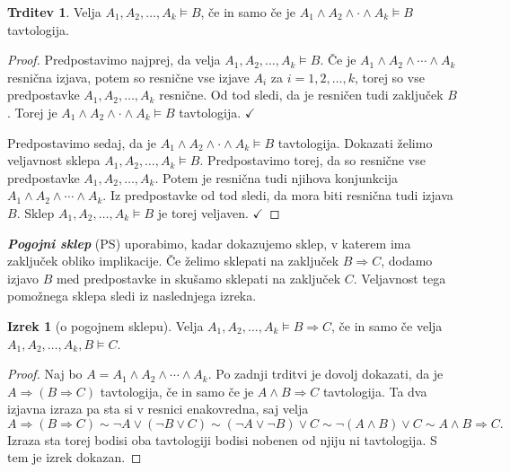 \documentclass[11pt]{book}
\def\definicija{\color{rdeca}\bf\em}
\def\kljuka{$\checkmark$}
\theoremstyle{definition}
\theoremstyle{zgled}
\theoremstyle{odprtproblem}
\theoremstyle{domacanaloga}
\newenvironment{dokaz}
    {\color{siva}\begin{proof}}
    {\end{proof}}
\theoremstyle{izrek}
\newtheorem*{izrek}{Izrek}
\newtheorem*{trditev}{Trditev}
\begin{document}
\begin{trditev}
Velja $A_1, A_2, \dots, A_k \models B$, če in samo če je $A_1 \land A_2 \land \cdot \land A_k \models B$ tavtologija.
\end{trditev}
\begin{dokaz}
Predpostavimo najprej, da velja $A_1, A_2, \dots, A_k \models B$. Če je $A_1 \land A_2 \land \cdots \land A_k$ resnična izjava, potem so resnične vse izjave $A_i$ za $i = 1,2, \dots, k$, torej so vse predpostavke $A_1, A_2, \dots, A_k$ resnične. Od tod sledi, da je resničen tudi zaključek $B$. Torej je $A_1 \land A_2 \land \cdot \land A_k \models B$ tavtologija. \kljuka

Predpostavimo sedaj, da je $A_1 \land A_2 \land \cdot \land A_k \models B$ tavtologija. Dokazati želimo veljavnost sklepa $A_1, A_2, \dots, A_k \models B$. Predpostavimo torej, da so resnične vse predpostavke $A_1, A_2, \dots, A_k$. Potem je resnična tudi njihova konjunkcija $A_1 \land A_2 \land \cdots \land A_k$. Iz predpostavke od tod sledi, da mora biti resnična tudi izjava $B$. Sklep $A_1, A_2, \dots, A_k \models B$ je torej veljaven. \kljuka
\end{dokaz}

{\definicija Pogojni sklep} (PS) uporabimo, kadar dokazujemo sklep, v katerem ima zaključek obliko implikacije. Če želimo sklepati na zaključek $B \Rightarrow C$, dodamo izjavo $B$ med predpostavke in skušamo sklepati na zaključek $C$. Veljavnost tega pomožnega sklepa sledi iz naslednjega izreka.

\begin{izrek}[o pogojnem sklepu]
Velja $A_1, A_2, \dots, A_k \models B \Rightarrow C$, če in samo če velja $A_1, A_2, \dots, A_k, B \models C$.
\end{izrek}
\begin{dokaz}
Naj bo $A = A_1 \land A_2 \land \cdots \land A_k$. Po zadnji trditvi je dovolj dokazati, da je $A \Rightarrow (B \Rightarrow C)$ tavtologija, če in samo če je $A \land B \Rightarrow C$ tavtologija. Ta dva izjavna izraza pa sta si v resnici enakovredna, saj velja
\[
    A \Rightarrow (B \Rightarrow C) \sim \lnot A \lor (\lnot B \lor C) \sim (\lnot A \lor \lnot B) \lor C \sim \lnot (A \land B) \lor C \sim A \land B \Rightarrow C.
\]
Izraza sta torej bodisi oba tavtologiji bodisi nobenen od njiju ni tavtologija. S tem je izrek dokazan.
\end{dokaz}
\end{document}
